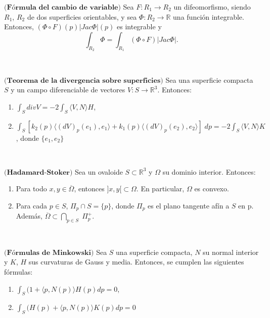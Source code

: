 \begin{teorema}
	$\textbf{(Fórmula del cambio de variable)}$ Sea $F : R_1 \to R_2$ un difeomorfismo, siendo $R_1$, $R_2$ de dos superficies orientables, y sea $\Phi : R_2 \to \mathbb{R}$ una función integrable. Entonces, $(\Phi \circ F)(p)|Jac \Phi|(p)$ es integrable y
	\[
	\int_{R_2} \Phi = \int_{R_1} (\Phi \circ F)|Jac \Phi|.
	\]
\end{teorema}
${ }$\\

\begin{teorema}\label{teo:divergencia}
	$\textbf{(Teorema de la divergencia sobre superficies)}$ Sea una superficie compacta $S$ y un campo diferenciable de vectores $V : S \to \mathbb{R}^3$. Entonces:
	\begin{enumerate}
		\item $\int_S div V = -2 \int_S \langle V, N \rangle H$,
		\item $\int_S [k_2(p) \langle (dV)_p(e_1), e_1\rangle + k_1(p) \langle (dV)_p(e_2), e_2 \rangle ] \; dp = -2 \int_S \langle V, N \rangle K$, donde $\{ e_1, e_2 \}$
	\end{enumerate}
\end{teorema}
${ }$\\

\begin{teorema} \label{teo:hadamard}
	$\textbf{(Hadamard-Stoker)}$ Sea un ovaloide $S \subset \mathbb{R}^3$ y $\Omega$ su dominio interior. Entonces:
	
	\begin{enumerate}
		\item Para todo $x, y \in \overline{\Omega}$, entonces $]x, y[ \subset \Omega$. En particular, $\Omega$ es convexo.
		\item Para cada $p \in S$, $\Pi_p \cap S = \{p\}$, donde $\Pi_p$ es el plano tangente afín a $S$ en p. Además, $\overline{\Omega} \subset \bigcap_{p \in S} \; \Pi^{+}_{p}$.
	\end{enumerate}
\end{teorema}
${ }$\\

\begin{teorema}
	$\textbf{(Fórmulas de Minkowski)}$ Sea $S$ una superficie compacta, $N$ su normal interior y $K$, $H$ sus curvaturas de Gauss y media. Entonces, se cumplen las siguientes fórmulas:
	\begin{enumerate}
		\item $\int_S (1 + \langle p, N(p) \rangle H(p) dp = 0$,
		\item $\int_S (H(p) + \langle p, N(p) \rangle K(p) dp = 0$
	\end{enumerate}
\end{teorema}
${ }$\\


